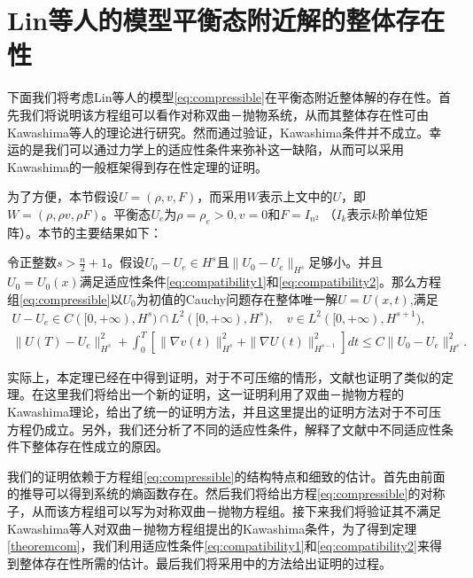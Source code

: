 \section{Lin等人的模型平衡态附近解的整体存在性}

下面我们将考虑Lin等人的模型\eqref{eq:compressible}在平衡态附近整体解的存在性。首先我们将说明该方程组可以看作对称双曲－抛物系统，从而其整体存在性可由Kawashima等人的理论\cite{kawashima1984systems,kawashima1985systems,yong2004entropy}进行研究。然而通过验证，Kawashima条件并不成立。幸运的是我们可以通过力学上的适应性条件来弥补这一缺陷，从而可以采用Kawashima的一般框架得到存在性定理的证明。

为了方便，本节假设$U = (\rho, v ,F)$，而采用$W$表示上文中的$U$，即$W=(\rho, \rho v ,\rho F)$。平衡态$U_e$为$\rho=\rho_e>0,  v =0 $和$F=I_{n^2}$ （$I_k$表示$k$阶单位矩阵）。本节的主要结果如下：
\begin{theorem}\label{theoremcom}
令正整数$s > \frac{n}{2}+1$。假设$U_0-U_e\in H^s$且$\|U_0-U_e\|_{H^s}$足够小。并且$U_0 = U_0(x)$满足适应性条件\eqref{eq:compatibility1}和\eqref{eq:compatibility2}。那么方程组\eqref{eq:compressible}以$U_0$为初值的Cauchy问题存在整体唯一解$U=U(x,t)$,满足
    \begin{eqnarray}\label{eq:thmincom}
       U - U_e\in C([0,+\infty), H^s) \cap L^2([0,+\infty), H^{s}), \nonumber \quad
         v \in L^2([0,+\infty), H^{s+1}),\\[2mm]
      \|U(T)-U_e\|_{H^s}^2 +  \int_0^T \left[\|\nabla  v (t) \|_{H^s}^2 + \|\nabla U(t)\|_{H^{s-1}}^2\right] dt
      \le C \|U_0-U_e\|_{H^s}^2 .
    \end{eqnarray}
\end{theorem}

实际上，本定理已经在\cite{qian2010global,hu2011global}中得到证明，对于不可压缩的情形，文献\cite{lin2005hydrodynamics,lei2008global,chen2006global}也证明了类似的定理。在这里我们将给出一个新的证明，这一证明利用了双曲－抛物方程的Kawashima理论，给出了统一的证明方法，并且这里提出的证明方法对于不可压方程仍成立。另外，我们还分析了不同的适应性条件，解释了文献\cite{lin2005hydrodynamics,lei2008global,chen2006global,qian2010global,hu2011global}中不同适应性条件下整体存在性成立的原因。

我们的证明依赖于方程组\eqref{eq:compressible}的结构特点和细致的估计。首先由前面的推导可以得到系统的熵函数存在。然后我们将给出方程\eqref{eq:compressible}的对称子，从而该方程组可以写为对称双曲－抛物方程组。接下来我们将验证其不满足Kawashima等人对双曲－抛物方程组提出的Kawashima条件，为了得到定理\ref{theoremcom}，我们利用适应性条件\eqref{eq:compatibility1}和\eqref{eq:compatibility2}来得到整体存在性所需的估计。最后我们将采用\cite{kawashima1984systems,yong2004entropy}中的方法给出证明的过程。

